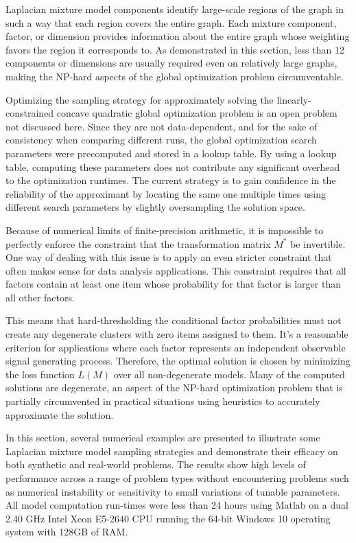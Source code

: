 \documentclass[10pt,letterpaper]{article}
\begin{document}
Laplacian mixture model components identify large-scale regions of the graph in such a way that each region covers the entire graph.
Each mixture component, factor, or dimension provides information about the entire graph whose weighting favors the region it corresponds to.
As demonstrated in this section, less than 12 components or dimensions are usually required even on relatively large graphs, making the NP-hard aspects of the global optimization problem circumventable.

Optimizing the sampling strategy for approximately solving the linearly-constrained concave quadratic global optimization problem is an open problem not discussed here.
Since they are not data-dependent, and for the sake of consistency when comparing different runs, the global optimization search parameters were precomputed and stored in a lookup table.
By using a lookup table, computing these parameters does not contribute any significant overhead to the optimization runtimes.
The current strategy is to gain confidence in the reliability of the approximant by locating the same one multiple times using different search parameters by slightly oversampling the solution space.

Because of numerical limits of finite-precision arithmetic, it is impossible to perfectly enforce the constraint that the transformation matrix $M^*$ be invertible.
One way of dealing with this issue is to apply an even stricter constraint that often makes sense for data analysis applications.
This constraint requires that all factors contain at least one item whose probability for that factor is larger than all other factors.

This means that hard-thresholding the conditional factor probabilities must not create any degenerate clusters with zero items assigned to them.
It's a reasonable criterion for applications where each factor represents an independent observable signal generating process.
Therefore, the optimal solution is chosen by minimizing the loss function $L(M)$ over all non-degenerate models.
Many of the computed solutions are degenerate, an aspect of the NP-hard optimization problem that is partially circumvented in practical situations using heuristics to accurately approximate the solution.

In this section, several numerical examples are presented to illustrate some Laplacian mixture model sampling strategies and demonstrate their efficacy on both synthetic and real-world problems.
The results show high levels of performance across a range of problem types without encountering problems such as numerical instability or sensitivity to small variations of tunable parameters.
All model computation run-times were less than 24 hours using {\sc Matlab} on a dual 2.40 GHz {\sc Intel Xeon E5-2640} CPU running the 64-bit {\sc Windows 10} operating system with 128GB of RAM.
\end{document}
